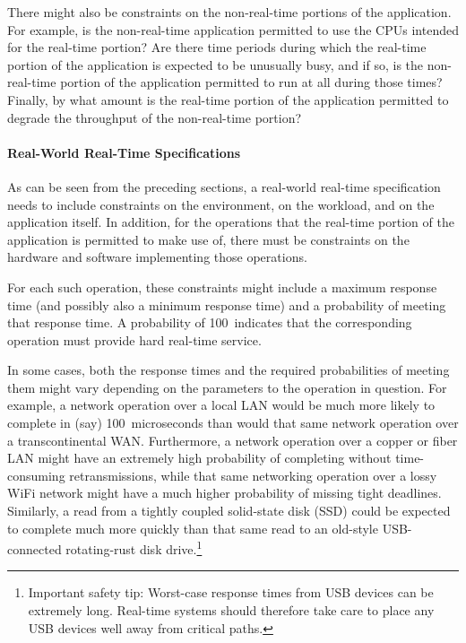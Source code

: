 There might also be constraints on the non-real-time portions of the
application.
For example, is the non-real-time application permitted to use the CPUs
intended for the real-time portion?
Are there time periods during which the real-time portion of the application
is expected to be unusually busy, and if so, is the non-real-time portion
of the application permitted to run at all during those times?
Finally, by what amount is the real-time portion of the application permitted
to degrade the throughput of the non-real-time portion?

\paragraph{Real-World Real-Time Specifications}
\label{sec:advsync:Real-World Real-Time Specifications}

As can be seen from the preceding sections, a real-world real-time
specification needs to include constraints on the environment,
on the workload, and on the application itself.
In addition, for the operations that the real-time portion of the
application is permitted to make use of, there must be constraints
on the hardware and software implementing those operations.

For each such operation, these constraints might include a maximum
response time (and possibly also a minimum response time) and a
probability of meeting that response time.
A probability of 100\pct\ indicates that the corresponding operation
must provide hard real-time service.

In some cases, both the response times and the required probabilities of
meeting them might vary depending on the parameters to the operation in
question.
For example, a network operation over a local LAN would be much more likely
to complete in (say) 100~microseconds than would that same network operation
over a transcontinental WAN\@.
Furthermore, a network operation over a copper or fiber
LAN might have an extremely
high probability of completing without time-consuming retransmissions,
while that same networking operation over a lossy WiFi network might
have a much higher probability of missing tight deadlines.
Similarly, a read from a tightly coupled solid-state disk (SSD) could be
expected to complete much more quickly than that same read to an old-style
USB-connected rotating-rust disk drive.\footnote{
	Important safety tip:
	Worst-case response times from USB devices can be extremely long.
	Real-time systems should therefore take care to place any USB
	devices well away from critical paths.}

